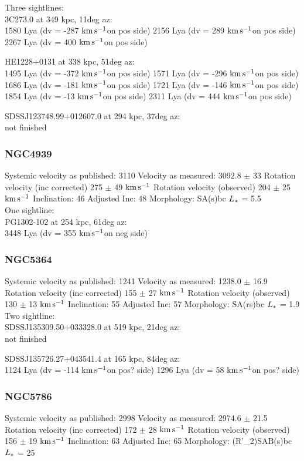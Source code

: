 \documentclass[iop]{emulateapj-rtx4}
\newcommand{\kms}{$\rm km\, s^{-1}$}
\begin{document}
Three sightlines: \\
3C273.0 at 349 kpc, 11deg az: \\
1580 Lya (dv = -287 \kms on pos side)
2156 Lya (dv = 289 \kms on pos side)
2267 Lya (dv = 400 \kms on pos side)


HE1228+0131 at 338 kpc, 51deg az: \\
1495 Lya (dv = -372 \kms on pos side)
1571 Lya (dv = -296 \kms on pos side)
1686 Lya (dv = -181 \kms on pos side)
1721 Lya (dv = -146 \kms on pos side)
1854 Lya (dv = -13 \kms on pos side)
2311 Lya (dv = 444 \kms on pos side)

SDSSJ123748.99+012607.0 at  294 kpc, 37deg az: \\
not finished


\subsubsection{NGC4939}
Systemic velocity as published: 3110
Velocity as measured: 3092.8 $\pm$ 33
Rotation velocity (inc corrected) 275 $\pm$ 49 \kms
Rotation velocity (observed) 204 $\pm$ 25 \kms
Inclination: 46
Adjusted Inc: 48
Morphology: SA(s)bc
$L_{\**}$ = 5.5 \\

One sightline: \\
PG1302-102 at 254 kpc, 61deg az: \\
3448 Lya (dv = 355 \kms on neg side)



\subsubsection{NGC5364}
Systemic velocity as published: 1241
Velocity as measured: 1238.0 $\pm$ 16.9
Rotation velocity (inc corrected) 155 $\pm$ 27 \kms
Rotation velocity (observed) 130 $\pm$ 13 \kms
Inclination: 55
Adjusted Inc: 57
Morphology: SA(rs)bc
$L_{\**}$ = 1.9 \\

Two sightline: \\
SDSSJ135309.50+033328.0 at 519 kpc, 21deg az: \\
not finished

SDSSJ135726.27+043541.4 at 165 kpc, 84deg az: \\
1124 Lya (dv = -114 \kms on pos? side)
1296 Lya (dv = 58 \kms on pos? side)



\subsubsection{NGC5786}
Systemic velocity as published: 2998
Velocity as measured: 2974.6 $\pm$ 21.5
Rotation velocity (inc corrected) 172 $\pm$ 28 \kms
Rotation velocity (observed) 156 $\pm$ 19 \kms
Inclination: 63
Adjusted Inc: 65
Morphology: (R'\_2)SAB(s)bc
$L_{\**}$ = 25 \\
\end{document}
